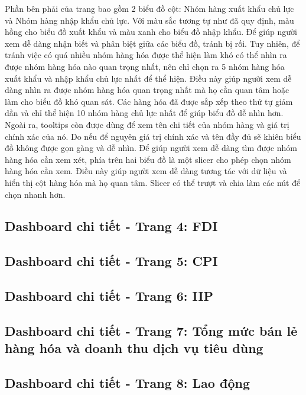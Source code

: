 \documentclass[a4paper]{report}
\begin{document}
{{Phần bên phải của trang bao gồm 2 biểu đồ cột: Nhóm hàng xuất khẩu chủ lực và Nhóm hàng nhập khẩu chủ lực. Với màu sắc tương tự như đã quy định, màu hồng cho biểu đồ xuất khẩu và màu xanh cho biểu đồ nhập khẩu. Để giúp người xem dễ dàng nhận biết và phân biệt giữa các biểu đồ, tránh bị rối.
Tuy nhiên, để tránh việc có quá nhiều nhóm hàng hóa được thể hiện làm khó có thể nhìn ra được nhóm hàng hóa nào quan trọng nhất, nên chỉ chọn ra 5 nhóm hàng hóa xuất khẩu và nhập khẩu chủ lực nhất để thể hiện. Điều này giúp người xem dễ dàng nhìn ra được nhóm hàng hóa quan trọng nhất mà họ cần quan tâm hoặc làm cho biểu đồ khó quan sát. Các hàng hóa đã được sắp xếp
theo thứ tự giảm dần và chỉ thể hiện 10 nhóm hàng chủ lực nhất để giúp biểu đồ dễ nhìn hơn. Ngoài ra, tooltips còn được dùng để xem tên chi tiết của nhóm hàng và giá trị chính xác của nó. Do nếu để nguyên giá trị chính xác và tên đầy đủ sẽ khiên biểu đồ không được gọn gàng và dễ nhìn.
Để giúp người xem dễ dàng tìm được nhóm hàng hóa cần xem xét, phía trên hai biểu đồ là một slicer cho phép chọn nhóm hàng hóa cần xem. Điều này giúp người xem dễ dàng tương tác với dữ liệu và hiển thị cột hàng hóa mà họ quan tâm. Slicer có thể trượt và chia làm các nút để chọn nhanh hơn.\\


\subsection{Dashboard chi tiết - Trang 4: FDI}


\newpage
\subsection{Dashboard chi tiết - Trang 5: CPI}


\newpage
\subsection{Dashboard chi tiết - Trang 6: IIP}


\newpage
\subsection{Dashboard chi tiết - Trang 7: Tổng mức bán lẻ hàng hóa và doanh thu dịch vụ tiêu dùng}

\newpage
\subsection{Dashboard chi tiết - Trang 8: Lao động}

}}
\end{document}
